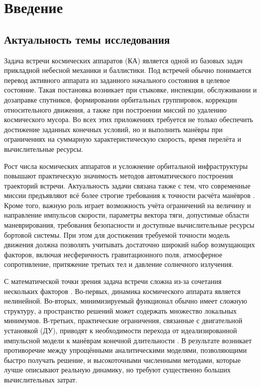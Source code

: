 \section{Введение}

\subsection{Актуальность темы исследования}

Задача встречи космических аппаратов (КА) является одной из базовых задач прикладной небесной механики и баллистики. Под встречей обычно понимается перевод активного аппарата из заданного начального состояния в целевое состояние. Такая постановка возникает при стыковке, инспекции, обслуживании и дозаправке спутников, формировании орбитальных группировок, коррекции относительного движения, а также при построении миссий по удалению космического мусора. Во всех этих приложениях требуется не только обеспечить достижение заданных конечных условий, но и выполнить манёвры при ограничениях на суммарную характеристическую скорость, время перелёта и вычислительные ресурсы.

Рост числа космических аппаратов и усложнение орбитальной инфраструктуры повышают практическую значимость методов автоматического построения траекторий встречи. Актуальность задачи связана также с тем, что современные миссии предъявляют всё более строгие требования к точности расчёта манёвров \cite{luo2014survey, баранов2016маневрирование, diprinzio2019methods}. Кроме того, важную роль играет возможность учёта ограничений на величину и направление импульсов скорости, параметры вектора тяги, допустимые области маневрирования, требования безопасности и доступные вычислительные ресурсы бортовой системы. При этом для достижения требуемой точности модель движения должна позволять учитывать достаточно широкий набор возмущающих факторов, включая несферичность гравитационного поля, атмосферное сопротивление, притяжение третьих тел и давление солнечного излучения.

С математической точки зрения задача встречи сложна из-за сочетания нескольких факторов \cite{luo2014survey, betts1998survey, chai2019review}. Во-первых, динамика космического аппарата является нелинейной. Во-вторых, минимизируемый функционал обычно имеет сложную структуру, а пространство решений может содержать множество локальных минимумов. В-третьих, практические ограничения, связанные с двигательной установкой (ДУ), приводят к необходимости перехода от идеализированной импульсной модели к манёврам конечной длительности \cite{morante2021survey, scarritt2012finite, ocampo2004finite, fogel2020multi}. В результате возникает противоречие между упрощёнными аналитическими моделями, позволяющими быстро получать решение, и высокоточными численными методами, которые лучше описывают реальную динамику, но требуют существенно больших вычислительных затрат.

